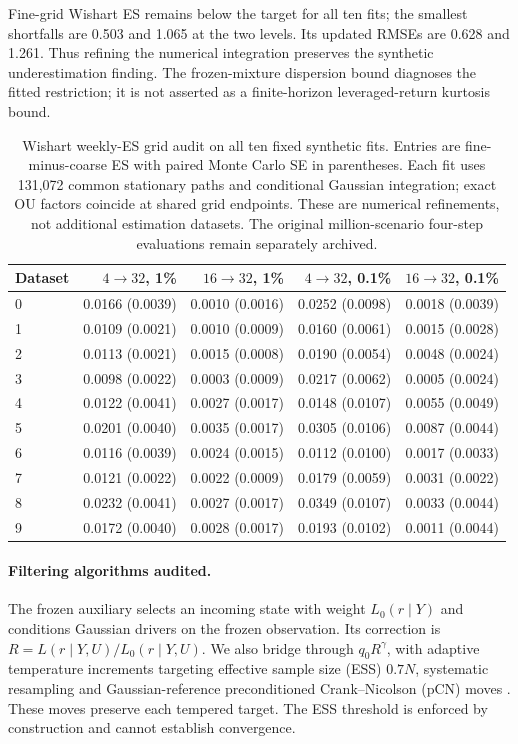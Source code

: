 \documentclass[11pt]{article}
\theoremstyle{definition}\newtheorem{definition}[theorem]{Definition}
\theoremstyle{remark}\newtheorem{remark}[theorem]{Remark}
\begin{document}
Fine-grid Wishart ES remains below the target for all ten fits; the smallest shortfalls are 0.503 and 1.065 at the two levels. Its updated RMSEs are 0.628 and 1.261. Thus refining the numerical integration preserves the synthetic underestimation finding. The frozen-mixture dispersion bound diagnoses the fitted restriction; it is not asserted as a finite-horizon leveraged-return kurtosis bound.

\begin{table}[htbp]
\centering\footnotesize
\setlength{\tabcolsep}{5pt}
\begin{tabular}{lrrrr}
\toprule
Dataset & $4\to32$, 1\% & $16\to32$, 1\% & $4\to32$, 0.1\% & $16\to32$, 0.1\% \\
\midrule
0 & 0.0166 (0.0039) & 0.0010 (0.0016) & 0.0252 (0.0098) & 0.0018 (0.0039) \\
1 & 0.0109 (0.0021) & 0.0010 (0.0009) & 0.0160 (0.0061) & 0.0015 (0.0028) \\
2 & 0.0113 (0.0021) & 0.0015 (0.0008) & 0.0190 (0.0054) & 0.0048 (0.0024) \\
3 & 0.0098 (0.0022) & 0.0003 (0.0009) & 0.0217 (0.0062) & 0.0005 (0.0024) \\
4 & 0.0122 (0.0041) & 0.0027 (0.0017) & 0.0148 (0.0107) & 0.0055 (0.0049) \\
5 & 0.0201 (0.0040) & 0.0035 (0.0017) & 0.0305 (0.0106) & 0.0087 (0.0044) \\
6 & 0.0116 (0.0039) & 0.0024 (0.0015) & 0.0112 (0.0100) & 0.0017 (0.0033) \\
7 & 0.0121 (0.0022) & 0.0022 (0.0009) & 0.0179 (0.0059) & 0.0031 (0.0022) \\
8 & 0.0232 (0.0041) & 0.0027 (0.0017) & 0.0349 (0.0107) & 0.0033 (0.0044) \\
9 & 0.0172 (0.0040) & 0.0028 (0.0017) & 0.0193 (0.0102) & 0.0011 (0.0044) \\
\bottomrule
\end{tabular}
\caption{Wishart weekly-ES grid audit on all ten fixed synthetic fits. Entries are fine-minus-coarse ES with paired Monte Carlo SE in parentheses. Each fit uses 131,072 common stationary paths and conditional Gaussian integration; exact OU factors coincide at shared grid endpoints. These are numerical refinements, not additional estimation datasets. The original million-scenario four-step evaluations remain separately archived.}\label{tab:wishart-coupled-grid}
\end{table}


\paragraph{Filtering algorithms audited.}
The frozen auxiliary selects an incoming state with weight $L_0(r\mid Y)$ and conditions Gaussian drivers on the frozen observation. Its correction is $R=L(r\mid Y,U)/L_0(r\mid Y,U)$. We also bridge through $q_0R^\gamma$, with adaptive temperature increments targeting effective sample size (ESS) $0.7N$, systematic resampling and Gaussian-reference preconditioned Crank--Nicolson (pCN) moves \citep{herbst2019tempered,cotter2013pcn}. These moves preserve each tempered target. The ESS threshold is enforced by construction and cannot establish convergence.
\end{document}
